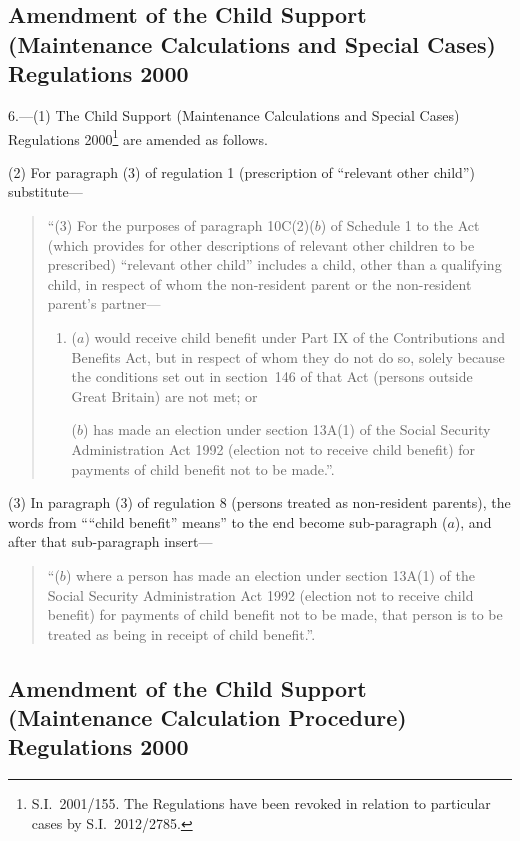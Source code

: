 \documentclass[12pt,a4paper]{article}
\begin{document}
\subsection[6. Amendment of the Child Support (Maintenance Calculations and Special Cases) Regulations 2000]{Amendment of the Child Support (Maintenance Calculations and Special Cases) Regulations 2000}

6.---(1)  The Child Support (Maintenance Calculations and Special Cases) Regulations 2000\footnote{S.I.~2001/155. The Regulations have been revoked in relation to particular cases by S.I.~2012/2785.} are amended as follows.

(2) For paragraph (3) of regulation 1 (prescription of “relevant other child”) substitute—
\begin{quotation}
“(3) For the purposes of paragraph 10C(2)($b$)  of Schedule 1 to the Act (which provides for other descriptions of relevant other children to be prescribed) “relevant other child” includes a child, other than a qualifying child, in respect of whom the non-resident parent or the non-resident parent’s partner—
\begin{enumerate}\item[]
($a$) would receive child benefit under Part IX of the Contributions and Benefits Act, but in respect of whom they do not do so, solely because the conditions set out in section~146 of that Act (persons outside Great Britain) are not met; or

($b$) has made an election under section 13A(1) of the Social Security Administration Act 1992 (election not to receive child benefit) for payments of child benefit not to be made.”.
\end{enumerate}
\end{quotation}

(3) In paragraph (3) of regulation 8 (persons treated as non-resident parents), the words from ““child benefit” means” to the end become sub-paragraph ($a$), and after that sub-paragraph insert—
\begin{quotation}
“($b$) where a person has made an election under section 13A(1) of the Social Security Administration Act 1992 (election not to receive child benefit) for payments of child benefit not to be made, that person is to be treated as being in receipt of child benefit.”.
\end{quotation}

\subsection[7. Amendment of the Child Support (Maintenance Calculation Procedure) Regulations 2000]{Amendment of the Child Support (Maintenance Calculation Procedure) Regulations 2000}
\end{document}
